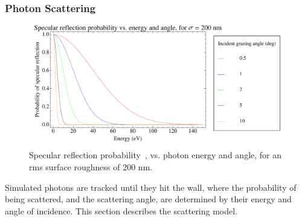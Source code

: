 \subsubsection{Photon Scattering} 

  \begin{figure}
  \centering
  \includegraphics[width=6in]{Synrad3d/specular-probability.pdf}
  \caption[Specular reflection probability vs. photon energy and angle]
{\label{f:spec.prob}
Specular reflection probability~\cite{b:beckmann}, vs. photon energy
and angle, for an rms surface roughness of 200 nm.}
  \end{figure}
   
Simulated photons are tracked until they hit the wall, where the
probability of being scattered, and the scattering angle, are
determined by their energy and angle of incidence.  This section
describes the scattering model.

